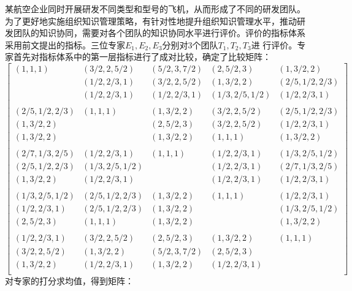 \documentclass[winfonts,UTF8]{ctexart}
\begin{document}
某航空企业同时开展研发不同类型和型号的飞机，从而形成了不同的研发团队。
为了更好地实施组织知识管理策略，有针对性地提升组织知识管理水平，推动研
发团队的知识协同，需要对各个团队的知识协同水平进行评价。评价的指标体系
采用前文提出的指标。三位专家$E_1,E_2,E_3$分别对3个团队$T_1,T_2,T_3$进
行评价。专家首先对指标体系中的第一层指标进行了成对比较，确定了比较矩阵：
\[
\left[
  \begin{array}{lllll}
(1,1,1)&(3/2,2,5/2)&(5/2,3,7/2)&(2,5/2,3)&(1,3/2,2)\\
       &(1/2,2/3,1)&(3/2,2,5/2)&(1,3/2,2)&(2/5,1/2,2/3)\\
       &(1/2,2/3,1)&(1/2,2/3,1)&(1/3,2/5,1/2)&(1/2,2/3,1)\\
\\
(2/5,1/2,2/3)&(1,1,1)&(1,3/2,2)&(3/2,2,5/2)&(2/5,1/2,2/3)\\
(1,3/2,2)&&(2,5/2,3)&(3/2,2,5/2)&(1/2,2/3,1)\\
(1,3/2,2)&&(1,3/2,2)&(1,1,1)&(1,3/2,2)\\
\\
(2/7,1/3,2/5)&(1/2,2/3,1)&(1,1,1)&(1/2,2/3,1)&(1/3,2/5,1/2)\\
(2/5,1/2,2/3)&(1/3,2/5,1/2)&&(1/2,2/3,1)&(2/7,1/3,2/5)\\
(1,3/2,2)&(1/2,2/3,1)&&(1/2,2/3,1)&(1/2,2/3,1)\\
\\
(1/3,2/5,1/2)&(2/5,1/2,2/3)&(1,3/2,2)&(1,1,1)&(1/2,2/3,1)\\
(1/2,2/3,1)&(2/5,1/2,2/3)&(1,3/2,2)&&(1/3,2/5,1/2)\\
(2,5/2,3)&(1,1,1)&(1,3/2,2)&&(1,3/2,2)\\
\\
(1/2,2/3,1)&(3/2,2,5/2)&(2,5/2,3)&(1,3/2,2)&(1,1,1)\\
(3/2,2,5/2)&(1,3/2,2)&(5/2,3,7/2)&(2,5/2,3)&\\
(1,3/2,2)&(1/2,2/3,1)&(1,3/2,2)&(1/2,2/3,1)&\\

  \end{array}
\right]
\]
对专家的打分求均值，得到矩阵：
\end{document}
